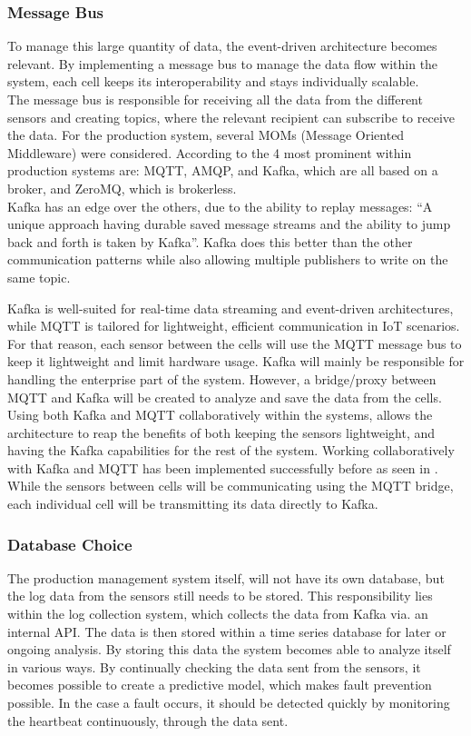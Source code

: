 \subsubsection{Message Bus}
To manage this large quantity of data, the event-driven architecture becomes relevant. By implementing a message bus to manage the data flow within the system, each cell keeps its interoperability and stays individually scalable. \\ 
The message bus is responsible for receiving all the data from the different sensors and creating topics, where the relevant recipient can subscribe to receive the data.
For the production system, several MOMs (Message Oriented Middleware) were considered. According to \cite{Message-orientedMiddleware} the 4 most prominent within production systems are: 
MQTT, AMQP, and Kafka, which are all based on a broker, and ZeroMQ, which is brokerless. \\
Kafka has an edge over the others, due to the ability to replay messages:
“A unique approach having durable saved message streams and the ability to jump back and forth is taken by Kafka”\cite{Message-orientedMiddleware}. 
Kafka does this better than the other communication patterns while also allowing multiple publishers to write on the same topic.

Kafka is well-suited for real-time data streaming and event-driven architectures, while MQTT is tailored for lightweight, efficient communication in IoT scenarios. For that reason, each sensor between the cells will use the MQTT message bus to keep it lightweight and limit hardware usage. Kafka will mainly be responsible for handling the enterprise part of the system. 
However, a bridge/proxy between MQTT and Kafka will be created to analyze and save the data from the cells. 
Using both Kafka and MQTT collaboratively within the systems, allows the architecture to reap the benefits of both keeping the sensors lightweight, and having the Kafka capabilities for the rest of the system.
Working collaboratively with Kafka and MQTT has been implemented successfully before as seen in \cite{HiveMQTTvsKafka}.
While the sensors between cells will be communicating using the MQTT bridge, each individual cell will be transmitting its data directly to Kafka. 
\\
\subsubsection{Database Choice}
The production management system itself, will not have its own database, but the log data from the sensors still needs to be stored. This responsibility lies within the log collection system, which collects the data from Kafka via. an internal API. The data is then stored within a time series\cite{timeseries_db} database for later or ongoing analysis.
By storing this data the system becomes able to analyze itself in various ways. By continually checking the data sent from the sensors, it becomes possible to create a predictive model, which makes fault prevention possible. In the case a fault occurs, it should be detected quickly by monitoring the heartbeat continuously, through the data sent.

